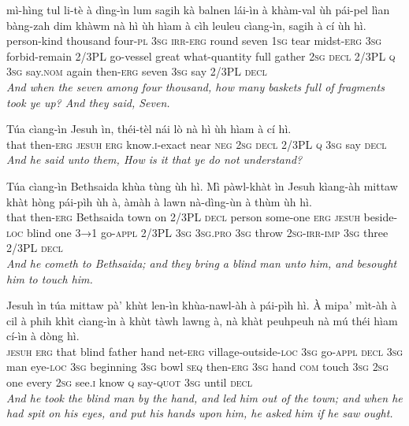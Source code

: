 \documentclass[11pt,a4paper]{article}
\begin{document}
\begin{exe}
\gll mì-hìng tul li-tè à dìng-ìn lum sagih kà balnen lái-ìn à khàm-val ùh pái-pel lìan bàng-zah dim khàwm nà hì ùh hìam à cìh leuleu cìang-ìn, sagih à cí ùh hì. \\
     person-kind thousand four-\textsc{pl} \textsc{3sg} \textsc{irr}-\textsc{erg} round seven \textsc{1sg} tear midst-\textsc{erg} \textsc{3sg} forbid-remain 2/3PL go-vessel great what-quantity full gather \textsc{2sg} \textsc{decl} 2/3PL \textsc{q} \textsc{3sg} say.\textsc{nom} again then-\textsc{erg} seven \textsc{3sg} say 2/3PL \textsc{decl} \\
\glt \textcolor{kjvcolor}{\textit{And when the seven among four thousand, how many baskets full of fragments took ye up? And they said, Seven.}}

\gll Túa cìang-ìn Jesuh ìn, théi-tèl nái lò nà hì ùh hìam à cí hì. \\
     that then-\textsc{erg} \textsc{jesuh} \textsc{erg} know.\textsc{i}-exact near \textsc{neg} \textsc{2sg} \textsc{decl} 2/3PL \textsc{q} \textsc{3sg} say \textsc{decl} \\
\glt \textcolor{kjvcolor}{\textit{And he said unto them, How is it that ye do not understand?}}

\gll Túa cìang-ìn Bethsaida khùa tùng ùh hì. Mì pàwl-khàt ìn Jesuh kìang-àh mittaw khàt hòng pái-pìh ùh à, àmàh à lawn nà-dìng-ùn à thùm ùh hì. \\
     that then-\textsc{erg} Bethsaida town on 2/3PL \textsc{decl} person some-one \textsc{erg} \textsc{jesuh} beside-\textsc{loc} blind one \textsc{3→1} go-\textsc{appl} 2/3PL \textsc{3sg} \textsc{3sg}.\textsc{pro} \textsc{3sg} throw \textsc{2sg}-\textsc{irr}-\textsc{imp} \textsc{3sg} three 2/3PL \textsc{decl} \\
\glt \textcolor{kjvcolor}{\textit{And he cometh to Bethsaida; and they bring a blind man unto him, and besought him to touch him.}}

\gll Jesuh ìn túa mittaw pà' khùt len-ìn khùa-nawl-àh à pái-pìh hì. À mipa' mìt-àh à cil à phih khìt cìang-ìn à khùt tàwh lawng à, nà khàt peuhpeuh nà mú théi hìam cí-ìn à dòng hì. \\
     \textsc{jesuh} \textsc{erg} that blind father hand net-\textsc{erg} village-outside-\textsc{loc} \textsc{3sg} go-\textsc{appl} \textsc{decl} \textsc{3sg} man eye-\textsc{loc} \textsc{3sg} beginning \textsc{3sg} bowl \textsc{seq} then-\textsc{erg} \textsc{3sg} hand \textsc{com} touch \textsc{3sg} \textsc{2sg} one every \textsc{2sg} see.\textsc{i} know \textsc{q} say-\textsc{quot} \textsc{3sg} until \textsc{decl} \\
\glt \textcolor{kjvcolor}{\textit{And he took the blind man by the hand, and led him out of the town; and when he had spit on his eyes, and put his hands upon him, he asked him if he saw ought.}}


\end{exe}
\end{document}
